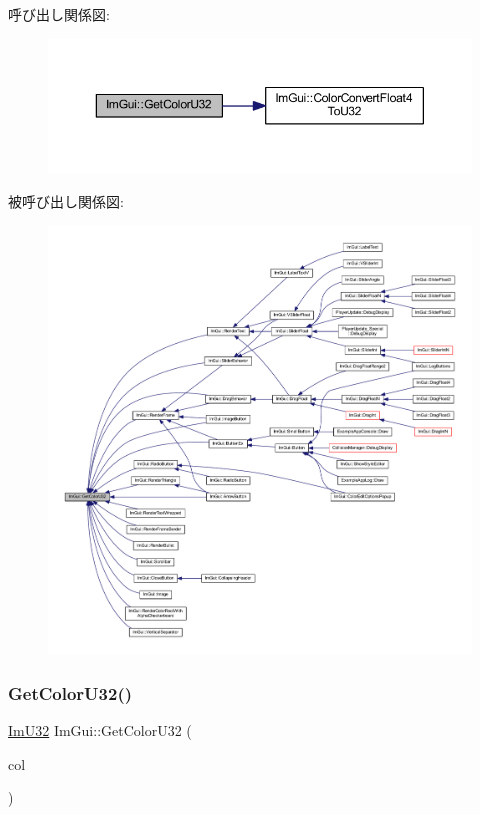呼び出し関係図\+:\nopagebreak
\begin{figure}[H]
\begin{center}
\leavevmode
\includegraphics[width=350pt]{namespace_im_gui_a0de2d9bd347d9866511eb8d014e62556_cgraph}
\end{center}
\end{figure}
被呼び出し関係図\+:\nopagebreak
\begin{figure}[H]
\begin{center}
\leavevmode
\includegraphics[width=350pt]{namespace_im_gui_a0de2d9bd347d9866511eb8d014e62556_icgraph}
\end{center}
\end{figure}
\mbox{\label{namespace_im_gui_ac701752365ddd58cecc1956fc62921a8}} 
\subsubsection{\texorpdfstring{Get\+Color\+U32()}{GetColorU32()}\hspace{0.1cm}{\footnotesize\ttfamily [2/3]}}
{\footnotesize\ttfamily \mbox{\hyperlink{imgui_8h_a118cff4eeb8d00e7d07ce3d6460eed36}{Im\+U32}} Im\+Gui\+::\+Get\+Color\+U32 (\begin{DoxyParamCaption}\item[{const \mbox{\hyperlink{struct_im_vec4}{Im\+Vec4}} \&}]{col }\end{DoxyParamCaption})}



